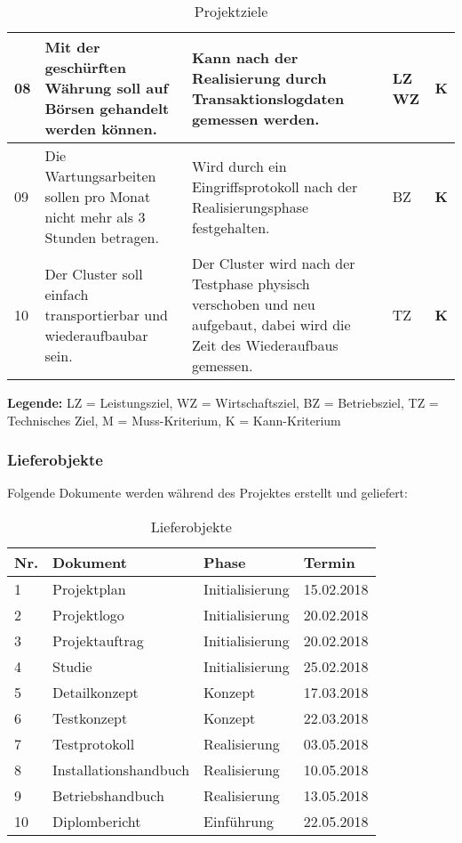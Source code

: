 \begin{table}[H]
\begin{tabular}[t]{p{0.7cm}|p{6.1cm}p{6.1cm} >{\centering}p{0.6cm}c}
08 & Mit der geschürften Währung soll auf Börsen gehandelt werden können. & Kann nach der Realisierung durch Transaktionslogdaten gemessen werden. & LZ \newline WZ & \textbf{K} \\\hline
09 & Die Wartungsarbeiten sollen pro Monat nicht mehr als 3 Stunden betragen. & Wird durch ein Eingriffsprotokoll nach der Realisierungsphase festgehalten. & BZ & \textbf{K} \\\hline
10 & Der Cluster soll einfach transportierbar und wiederaufbaubar sein. & Der Cluster wird nach der Testphase physisch verschoben und neu aufgebaut, dabei wird die Zeit des Wiederaufbaus gemessen. & TZ & \textbf{K}\\\hline
\end{tabular}
\caption{Projektziele}
\end{table}

\textbf{Legende:} LZ = Leistungsziel, WZ = Wirtschaftsziel, BZ = Betriebsziel, TZ = Technisches Ziel, \newline M = Muss-Kriterium, K = Kann-Kriterium

\subsubsection{Lieferobjekte}
Folgende Dokumente werden während des Projektes erstellt und geliefert:

\begin{table}[H]
\begin{tabular}[t]{p{0.5cm}p{6.5cm}p{6.5cm}p{1.8cm}}
\hline
\rowcolor{heading}\textbf{Nr.} & \textbf{Dokument} & \textbf{Phase} & \textbf{Termin} \\\hline
1 & Projektplan & Initialisierung & 15.02.2018 \\\hline
2 & Projektlogo & Initialisierung & 20.02.2018 \\\hline
3 & Projektauftrag & Initialisierung & 20.02.2018 \\\hline
4 & Studie & Initialisierung & 25.02.2018 \\\hline
5 & Detailkonzept & Konzept & 17.03.2018 \\\hline
6 & Testkonzept & Konzept & 22.03.2018 \\\hline
7 & Testprotokoll & Realisierung & 03.05.2018 \\\hline
8 & Installationshandbuch & Realisierung & 10.05.2018 \\\hline
9 & Betriebshandbuch & Realisierung & 13.05.2018 \\\hline
10 & Diplombericht & Einführung & 22.05.2018 \\\hline

\end{tabular}
\caption{Lieferobjekte}
\end{table}


 

